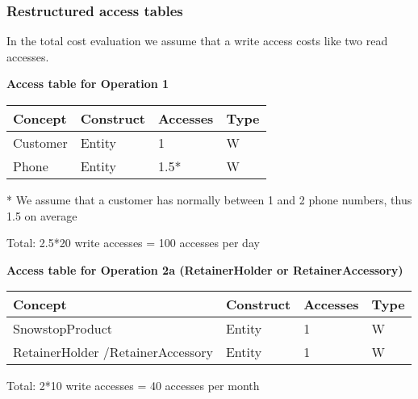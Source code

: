 {\subsubsection{Restructured access tables}

In the total cost evaluation we assume that a write access costs like two read accesses.


\vspace{12px}

{\centering \textbf{Access table for Operation 1}\\}
\begin{table}[H]
  \def\arraystretch{1.10}%
  \centering
  \begin{tabular}{ | m{4cm} | m{4cm}| m{3cm} | m{2cm} |}
    \hline
    {\textbf{\large Concept}} & {\textbf{\large Construct}} & {\textbf{\large Accesses}} & {\textbf{\large Type}} \\
    \hline
    \color[HTML]{3531FF} Customer & Entity & 1 & W \\
    \hline
    \color[HTML]{3531FF} Phone & Entity & 1.5* & W \\
    \hline
  \end{tabular}
  * \small{We assume that a customer has normally between 1 and 2 phone numbers, thus 1.5 on average}
\end{table}
Total: 2.5*20 write accesses = 100 accesses per day

\vspace{12px}

{\centering \textbf{Access table for Operation 2a (RetainerHolder or RetainerAccessory)}\\}
\begin{table}[H]
  \def\arraystretch{1.10}%
  \centering
  \begin{tabular}{ | m{4cm} | m{4cm}| m{3cm} | m{2cm} |}
    \hline
    {\textbf{\large Concept}} & {\textbf{\large Construct}} & {\textbf{\large Accesses}} & {\textbf{\large Type}} \\
    \hline
    \color[HTML]{3531FF} SnowstopProduct & Entity & 1 & W \\
    \hline
    \color[HTML]{3531FF} RetainerHolder /\newline RetainerAccessory & Entity & 1 & W \\
    \hline
  \end{tabular}
\end{table}
Total: 2*10 write accesses = 40 accesses per month

}
